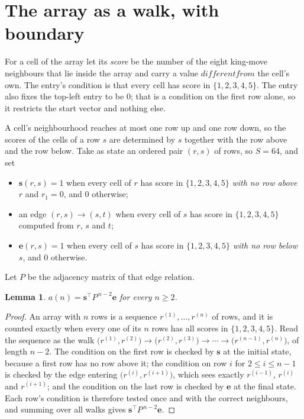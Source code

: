 \documentclass[11pt,a4paper]{article}
\theoremstyle{plain}
\newtheorem{lemma}[theorem]{Lemma}
\theoremstyle{definition}
\begin{document}
\section{The array as a walk, with boundary}

For a cell of the array let its \emph{score} be the number of the eight king-move neighbours that lie inside
the array and carry a value $different from$ the cell's own. The entry's condition is that every cell
has score in $\{1,2,3,4,5\}$. The entry also fixes the top-left entry to be $0$; that is a condition on the first row alone, so it restricts the start vector and nothing else.

A cell's neighbourhood reaches at most one row up and one row down, so the scores of the
cells of a row $s$ are determined by $s$ together with the row above and the row below.
Take as state an ordered pair $(r,s)$ of rows, so $S=64$, and set
\begin{itemize}
\item $\mathbf{s}(r,s)=1$ when every cell of $r$ has score in $\{1,2,3,4,5\}$ \emph{with no row
above $r$} and $r_1=0$, and $0$ otherwise;
\item an edge $(r,s)\to(s,t)$ when every cell of $s$ has score in $\{1,2,3,4,5\}$ computed from
$r$, $s$ and $t$;
\item $\mathbf{e}(r,s)=1$ when every cell of $s$ has score in $\{1,2,3,4,5\}$ \emph{with no row
below $s$}, and $0$ otherwise.
\end{itemize}
Let $P$ be the adjacency matrix of that edge relation.

\begin{lemma}\label{lem:walk}
$a(n)=\mathbf{s}^{\!\top}P^{\,n-2}\mathbf{e}$ for every $n\ge2$.
\end{lemma}

\begin{proof}
An array with $n$ rows is a sequence $r^{(1)},\dots,r^{(n)}$ of rows, and it is counted
exactly when every one of its $n$ rows has all scores in $\{1,2,3,4,5\}$. Read the sequence as the
walk $\bigl(r^{(1)},r^{(2)}\bigr)\to\bigl(r^{(2)},r^{(3)}\bigr)\to\cdots\to
\bigl(r^{(n-1)},r^{(n)}\bigr)$, of length $n-2$. The condition on the first row is
checked by $\mathbf{s}$ at the initial state, because a first row has no row above it; the
condition on row $i$ for $2\le i\le n-1$ is checked by the edge entering
$\bigl(r^{(i)},r^{(i+1)}\bigr)$, which sees exactly $r^{(i-1)}$, $r^{(i)}$ and
$r^{(i+1)}$; and the condition on the last row is checked by $\mathbf{e}$ at the final
state. Each row's condition is therefore tested once and with the correct neighbours, and
summing over all walks gives $\mathbf{s}^{\!\top}P^{\,n-2}\mathbf{e}$.
\end{proof}
\end{document}
